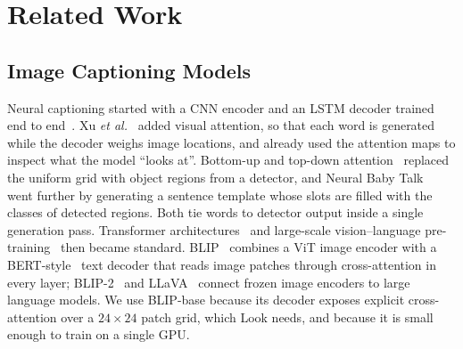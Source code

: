 \section{Related Work}
\label{sec:related}

\subsection{Image Captioning Models}
Neural captioning started with a CNN encoder and an LSTM decoder trained end to end~\cite{vinyals2015show}. Xu \emph{et al.}~\cite{xu2015show} added visual attention, so that each word is generated while the decoder weighs image locations, and already used the attention maps to inspect what the model ``looks at''. Bottom-up and top-down attention~\cite{anderson2018bottom} replaced the uniform grid with object regions from a detector, and Neural Baby Talk~\cite{lu2018neural} went further by generating a sentence template whose slots are filled with the classes of detected regions. Both tie words to detector output inside a single generation pass. Transformer architectures~\cite{vaswani2017attention,dosovitskiy2021image} and large-scale vision--language pre-training~\cite{radford2021learning} then became standard. BLIP~\cite{li2022blip} combines a ViT image encoder with a BERT-style~\cite{devlin2019bert} text decoder that reads image patches through cross-attention in every layer; BLIP-2~\cite{li2023blip2} and LLaVA~\cite{liu2023visual} connect frozen image encoders to large language models. We use BLIP-base because its decoder exposes explicit cross-attention over a $24\times24$ patch grid, which Look needs, and because it is small enough to train on a single GPU.

